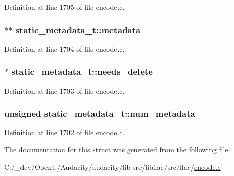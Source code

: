 Definition at line 1705 of file encode.\+c.

\subsubsection[{\texorpdfstring{metadata}{metadata}}]{$\ast$$\ast$ static\+\_\+metadata\+\_\+t\+::metadata}\hypertarget{structstatic__metadata__t_aeaef1febb6fcbd68dbb600641e70c826}{}\label{structstatic__metadata__t_aeaef1febb6fcbd68dbb600641e70c826}


Definition at line 1704 of file encode.\+c.

\subsubsection[{\texorpdfstring{needs\+\_\+delete}{needs_delete}}]{$\ast$ static\+\_\+metadata\+\_\+t\+::needs\+\_\+delete}\hypertarget{structstatic__metadata__t_a45e0f08a57ffc45f5f067e043e0b6eed}{}\label{structstatic__metadata__t_a45e0f08a57ffc45f5f067e043e0b6eed}


Definition at line 1703 of file encode.\+c.

\subsubsection[{\texorpdfstring{num\+\_\+metadata}{num_metadata}}]{\setlength{\rightskip}{0pt plus 5cm}unsigned static\+\_\+metadata\+\_\+t\+::num\+\_\+metadata}\hypertarget{structstatic__metadata__t_a9ea8b87a5f60a3aac52df745acc1bec7}{}\label{structstatic__metadata__t_a9ea8b87a5f60a3aac52df745acc1bec7}


Definition at line 1702 of file encode.\+c.



The documentation for this struct was generated from the following file\+:\begin{DoxyCompactItemize}
\item 
C\+:/\+\_\+dev/\+Open\+U/\+Audacity/audacity/lib-\/src/libflac/src/flac/\hyperlink{libflac_2src_2flac_2encode_8c}{encode.\+c}\end{DoxyCompactItemize}
